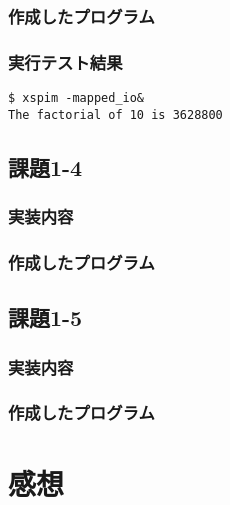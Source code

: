 \documentclass[a4j,11pt]{jarticle}
\begin{document}
  \subsubsection{作成したプログラム}
   
  \subsubsection{実行テスト結果}
\begin{verbatim}
$ xspim -mapped_io&
The factorial of 10 is 3628800
\end{verbatim}

 \subsection{課題1-4}
  \subsubsection{実装内容}
  \subsubsection{作成したプログラム}
   

 \subsection{課題1-5}
  \subsubsection{実装内容}
  \subsubsection{作成したプログラム}
   

\section{感想}
\end{document}
